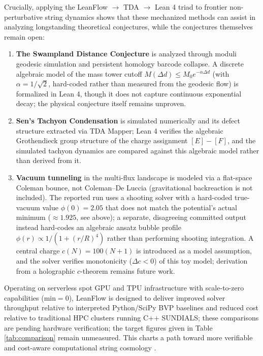 \documentclass[11pt,a4paper]{article}
\newcommand{\numreconcile}[2]{#1}
\begin{document}
Crucially, applying the LeanFlow $\to$ TDA $\to$ Lean 4 triad to frontier non-perturbative string dynamics shows that these mechanized methods can assist in analyzing longstanding theoretical conjectures, while the conjectures themselves remain open:
\begin{enumerate}
    \item \textbf{The Swampland Distance Conjecture} is analyzed through moduli geodesic simulation and persistent homology barcode collapse. A discrete algebraic model of the mass tower cutoff $M(\Delta d) \le M_0 e^{-\alpha \Delta d}$ (with $\alpha = 1/\sqrt{2}$, hard-coded rather than measured from the geodesic flow) is formalized in Lean 4, though it does not capture continuous exponential decay; the physical conjecture itself remains unproven.
    \item \textbf{Sen's Tachyon Condensation} is simulated numerically and its defect structure extracted via TDA Mapper; Lean 4 verifies the algebraic Grothendieck group structure of the charge assignment $[E] - [F]$, and the simulated tachyon dynamics are compared against this algebraic model rather than derived from it.
    \item \textbf{Vacuum tunneling} in the multi-flux landscape is modeled via a flat-space Coleman bounce, not Coleman--De Luccia (gravitational backreaction is not included). The reported run uses a shooting solver with a hard-coded true-vacuum value $\phi(0) = \numreconcile{2.05}{CDL true-vacuum field value}$ that does not match the potential's actual minimum ($\approx 1.925$, see above); a separate, disagreeing committed output instead hard-codes an algebraic ansatz bubble profile $\phi(r) \propto 1/(1+(r/R)^4)$ rather than performing shooting integration. A central charge $c(N) = 100(N+1)$ is introduced as a model assumption, and the solver verifies monotonicity ($\Delta c < 0$) of this toy model; derivation from a holographic $c$-theorem remains future work.
\end{enumerate}

Operating on serverless spot GPU and TPU infrastructure with scale-to-zero capabilities ($\text{min}=0$), LeanFlow is designed to deliver improved solver throughput relative to interpreted Python/SciPy BVP baselines and reduced cost relative to traditional HPC clusters running C++ SUNDIALS; these comparisons are pending hardware verification; the target figures given in Table \ref{tab:comparison} remain unmeasured. This charts a path toward more verifiable and cost-aware computational string cosmology \cite{socrate2026}.
\end{document}
